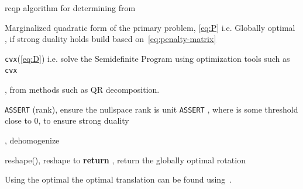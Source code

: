 \begin{algorithm}
	\algrenewcommand{}
	\algrenewcommand{}
	\caption{\gls{rcqp} algorithm for determining \tf[R]{\star}{} from }
	\label{alg:rcqp}
	\begin{algorithmic}[1]
		\Require Marginalized quadratic form of the primary problem, \ref{eq:P} i.e. 
		\Ensure Globally optimal \tf[R]{\star}{}, if strong duality holds
		\State {} build based on~\ref{eq:penalty-matrix}

		\State {} \texttt{cvx}(\ref{eq:D}) i.e. solve the Semidefinite Program using optimization tools such as \texttt{cvx} 

		\State {}, from methods such as QR decomposition.

		\State \texttt{ASSERT} (rank), ensure the nullspace rank is unit
		\State \texttt{ASSERT}   , where \mvar{\epsilon} is some threshold close to \num{0}, to ensure strong duality
		
		\State {}, dehomogenize 

		\State \mvar{\tf[R]{\star}{} \gets} reshape(), reshape  to 
		\State \textbf{return} \tf[R]{\star}{}, return the globally optimal rotation
	\end{algorithmic}
\end{algorithm}

Using the optimal \tf[R]{\star}{} the optimal translation can be found using~.

